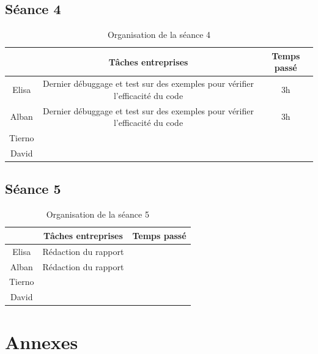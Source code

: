 \documentclass{rapport}
\begin{document}
\subsection{Séance 4}

\begin{table}[H]
	\centering 
	\begin{tabular}{c|c|c}
		& Tâches entreprises& Temps passé\\ \hline
		Elisa& Dernier débuggage et test sur des exemples pour vérifier l'efficacité du code& 3h\\ \hline
		Alban& Dernier débuggage et test sur des exemples pour vérifier l'efficacité du code& 3h\\ \hline
		Tierno& & \\ \hline
		David& & 
	\end{tabular}
	\caption{Organisation de la séance 4}
\end{table}

\subsection{Séance 5} %

\begin{table}[H]
	\centering 
	\begin{tabular}{c|c|c}
		& Tâches entreprises& Temps passé\\ \hline
		Elisa& Rédaction du rapport & \\ \hline
		Alban& Rédaction du rapport & \\ \hline
		Tierno& & \\ \hline
		David& & 
	\end{tabular}
	\caption{Organisation de la séance 5}
\end{table}

\newpage

\section{Annexes}

\lstset{style=mystyle}
\end{document}
